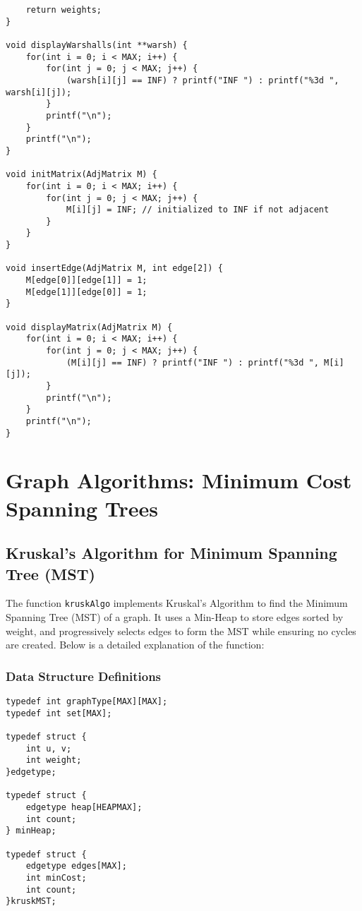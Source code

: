\documentclass{book}
\begin{document}
\begin{verbatim}
    return weights;
}

void displayWarshalls(int **warsh) {
    for(int i = 0; i < MAX; i++) {
        for(int j = 0; j < MAX; j++) {
            (warsh[i][j] == INF) ? printf("INF ") : printf("%3d ", warsh[i][j]);
        }
        printf("\n");
    }
    printf("\n");
} 

void initMatrix(AdjMatrix M) {
    for(int i = 0; i < MAX; i++) {
        for(int j = 0; j < MAX; j++) {
            M[i][j] = INF; // initialized to INF if not adjacent
        }
    }
}

void insertEdge(AdjMatrix M, int edge[2]) {
    M[edge[0]][edge[1]] = 1;
    M[edge[1]][edge[0]] = 1;
}

void displayMatrix(AdjMatrix M) {
    for(int i = 0; i < MAX; i++) {
        for(int j = 0; j < MAX; j++) {
            (M[i][j] == INF) ? printf("INF ") : printf("%3d ", M[i][j]);
        }
        printf("\n");
    }
    printf("\n");
}
\end{verbatim}

\twocolumn
\chapter{Graph Algorithms: Minimum Cost Spanning Trees}
\section{Kruskal's Algorithm for Minimum Spanning Tree (MST)}

The function \texttt{kruskAlgo} implements Kruskal's Algorithm to find the Minimum Spanning Tree (MST) of a graph. It uses a Min-Heap to store edges sorted by weight, and progressively selects edges to form the MST while ensuring no cycles are created. Below is a detailed explanation of the function:

\subsection{Data Structure Definitions}
\begin{verbatim}
typedef int graphType[MAX][MAX];
typedef int set[MAX]; 

typedef struct {
	int u, v; 
	int weight; 
}edgetype;

typedef struct {
	edgetype heap[HEAPMAX];
	int count;
} minHeap;

typedef struct {
    edgetype edges[MAX];
	int minCost;
	int count;
}kruskMST;

\end{verbatim}
\end{document}
